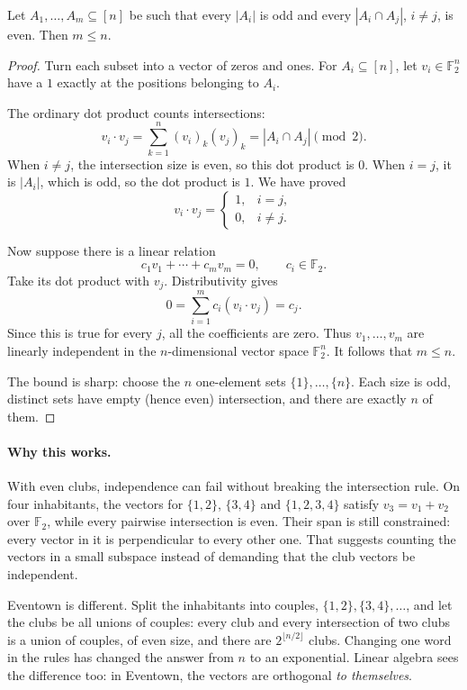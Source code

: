 \begin{theorem}\label{combinatorial:thm:oddtown}
Let $A_1,\dots,A_m\subseteq[n]$ be such that every $|A_i|$ is odd and every $|A_i\cap A_j|$, $i\ne j$, is even. Then $m\le n$.
\end{theorem}
\begin{proof}
Turn each subset into a vector of zeros and ones. For $A_i\subseteq[n]$, let $v_i\in\mathbb F_2^n$ have a $1$ exactly at the positions belonging to $A_i$.

The ordinary dot product counts intersections:
\[
v_i\cdot v_j=\sum_{k=1}^n(v_i)_k(v_j)_k
            =|A_i\cap A_j|\pmod2.
\]
When $i\ne j$, the intersection size is even, so this dot product is $0$. When $i=j$, it is $|A_i|$, which is odd, so the dot product is $1$. We have proved
\[
v_i\cdot v_j=
\begin{cases}1,&i=j,\\0,&i\ne j.\end{cases}
\]

Now suppose there is a linear relation
\[
c_1v_1+\cdots+c_mv_m=0,\qquad c_i\in\mathbb F_2.
\]
Take its dot product with $v_j$. Distributivity gives
\[
0=\sum_{i=1}^m c_i(v_i\cdot v_j)=c_j.
\]
Since this is true for every $j$, all the coefficients are zero. Thus $v_1,\ldots,v_m$ are linearly independent in the $n$-dimensional vector space $\mathbb F_2^n$. It follows that $m\le n$.

The bound is sharp: choose the $n$ one-element sets $\{1\},\ldots,\{n\}$. Each size is odd, distinct sets have empty (hence even) intersection, and there are exactly $n$ of them.
\end{proof}

\paragraph{Why this works.}
With even clubs, independence can fail without breaking the intersection
rule. On four inhabitants, the vectors for $\{1,2\}$, $\{3,4\}$ and
$\{1,2,3,4\}$ satisfy $v_3=v_1+v_2$ over $\mathbb F_2$, while every
pairwise intersection is even. Their span is still constrained: every vector
in it is perpendicular to every other one. That suggests counting the
vectors in a small subspace instead of demanding that the club vectors
be independent.

Eventown is different. Split the inhabitants into couples, $\{1,2\},\{3,4\},\dots$, and let the clubs be all unions of couples: every club and every
intersection of two clubs is a union of couples, of even size, and there are $2^{\lfloor n/2\rfloor}$ clubs. Changing one word in the rules has
changed the answer from $n$ to an exponential. Linear algebra sees the difference too: in Eventown, the vectors are orthogonal \emph{to themselves}.

